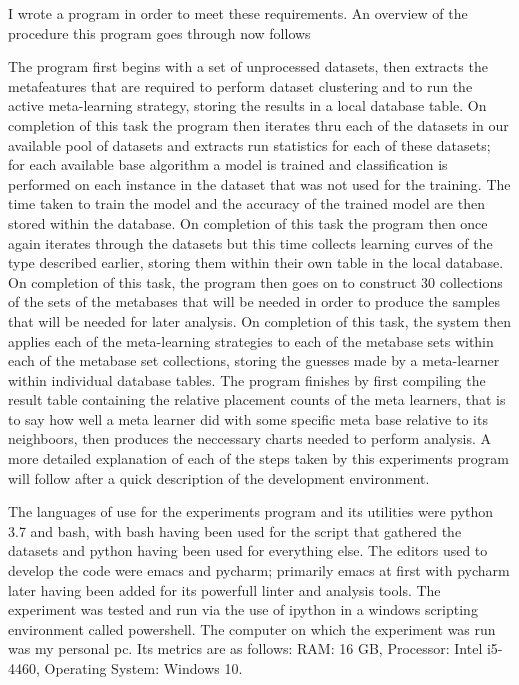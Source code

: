\documentclass{article}
\begin{document}
I wrote a program in order to meet these requirements.
An overview of the procedure this program goes through now follows

The program first begins with a set of unprocessed datasets, then extracts the
metafeatures that are required to perform dataset clustering and to run the
active meta-learning strategy, storing the results in a local database table.
On completion of this task the program then iterates thru each of the datasets
in our available pool of datasets and extracts run statistics for each of these
datasets; for each available base algorithm a model is trained and
classification is performed on each instance in the dataset that was not used
for the training. The time taken to train the model and the accuracy of the
trained model are then stored within the database. On completion of this task
the program then once again iterates through the datasets but this time collects
learning curves of the type described earlier, storing them within their own
table in the local database. On completion of this task, the program then goes on
to construct 30 collections of the sets of the metabases that will be needed in
order to produce the samples that will be needed for later analysis. On
completion of this task, the system then applies each of the meta-learning
strategies to each of the metabase sets within each of the metabase set
collections, storing the guesses made by a meta-learner within individual
database tables. The program finishes by first compiling the result table
containing the relative placement counts of the meta learners, that is to say
how well a meta learner did with some specific meta base relative to its
neighboors, then produces the neccessary charts needed to perform analysis.
A more detailed explanation of each of the steps taken by this experiments
program will follow after a quick description of the development environment.

The languages of use for the experiments program and its utilities were python
3.7 and bash, with bash having been used for the script that gathered the
datasets and python having been used for everything else. The editors used to
develop the code were emacs and pycharm; primarily emacs at first with pycharm
later having been added for its powerfull linter and analysis tools. The experiment
was tested and run via the use of ipython in a windows scripting environment
called powershell. The computer on which the experiment was run was my personal
pc. Its metrics are as follows: RAM: 16 GB, Processor: Intel i5-4460,
Operating System: Windows 10.
\end{document}
